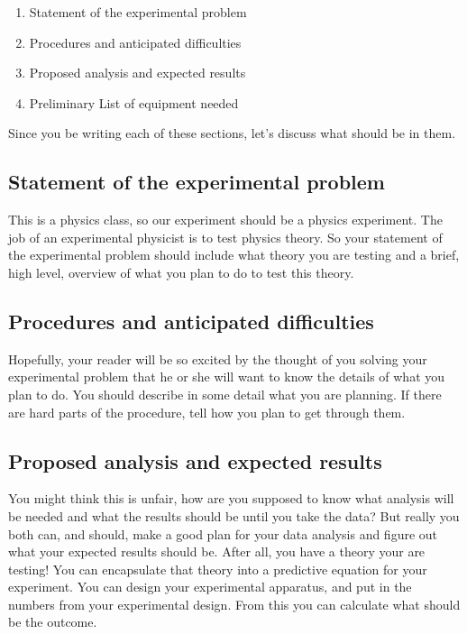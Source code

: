 \begin{enumerate}
	\item Statement of the experimental problem
	
	\item Procedures and anticipated difficulties
	
	\item Proposed analysis and expected results
	
	\item Preliminary List of equipment needed
\end{enumerate}

Since you be writing each of these sections, let's discuss what should be in them.

\subsection{Statement of the experimental problem}

This is a physics class, so our experiment should be a physics experiment. The job of an experimental physicist is to test physics theory. So your statement of the experimental problem should include what theory you are testing and a brief, high level, overview of what you plan to do to test this theory.

\subsection{Procedures and anticipated difficulties}

Hopefully, your reader will be so excited by the thought of you solving your experimental problem that he or she will want to know the details of what you plan to do. You should describe in some detail what you are planning. If there are hard parts of the procedure, tell how you plan to get through them.

\subsection{Proposed analysis and expected results}

You might think this is unfair, how are you supposed to know what analysis will be needed and what the results should be until you take the data? But really you both can, and should, make a good plan for your data analysis and figure out what your expected results should be. After all, you have a theory your are testing! You can encapsulate that theory into a predictive equation for your experiment. You can design your experimental apparatus, and put in the numbers from your experimental design. From this you can calculate what should be the outcome.

